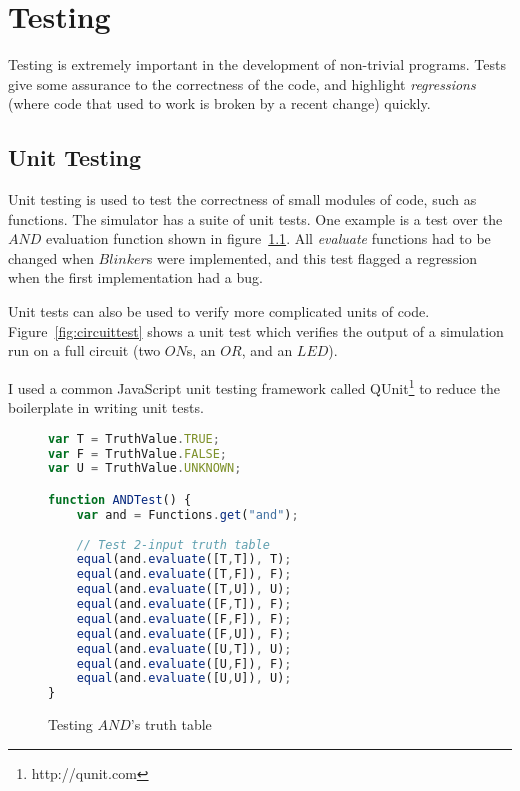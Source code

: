 \chapter{Testing}
Testing is extremely important in the development of non-trivial programs. Tests give some assurance to the correctness of the code, and highlight \textit{regressions} (where code that used to work is broken by a recent change) quickly.

\section{Unit Testing}
Unit testing is used to test the correctness of small modules of code, such as functions. The simulator has a suite of unit tests. One example is a test over the $AND$ evaluation function shown in figure~\ref{fig:andtest}. All \textit{evaluate} functions had to be changed when $Blinker$s were implemented, and this test flagged a regression when the first implementation had a bug.

Unit tests can also be used to verify more complicated units of code. Figure~\ref{fig:circuittest} shows a unit test which verifies the output of a simulation run on a full circuit (two $ON$s, an $OR$, and an $LED$).

I used a common JavaScript unit testing framework called QUnit\footnote{http://qunit.com} to reduce the boilerplate in writing unit tests.

\begin{figure}
\begin{lstlisting}[language=JavaScript]
var T = TruthValue.TRUE;
var F = TruthValue.FALSE;
var U = TruthValue.UNKNOWN;

function ANDTest() {
	var and = Functions.get("and");	
	
	// Test 2-input truth table
	equal(and.evaluate([T,T]), T);
	equal(and.evaluate([T,F]), F);
	equal(and.evaluate([T,U]), U);
	equal(and.evaluate([F,T]), F);
	equal(and.evaluate([F,F]), F);
	equal(and.evaluate([F,U]), F);
	equal(and.evaluate([U,T]), U);
	equal(and.evaluate([U,F]), F);
	equal(and.evaluate([U,U]), U);
}
\end{lstlisting}
\caption{Testing $AND$'s truth table}
\label{fig:andtest}
\end{figure}

